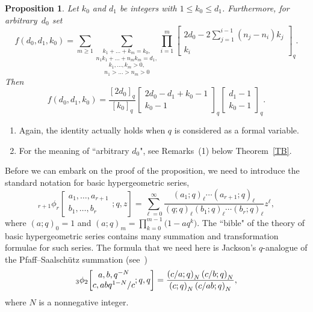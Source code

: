 \documentclass[10pt,a4paper]{amsart}
\newtheorem{Proposition}[Theorem]{Proposition}
 { \theoremstyle{definition}
\newtheorem{Definition}[Theorem]{Definition}
\newtheorem{Note}[Theorem]{Note}
\newtheorem{Example}[Theorem]{Example}
\newtheorem{Remark}[Theorem]{Remark}
\newtheorem*{Remarks}{Remarks} }
\def\poq#1#2{(#1;q)_#2}
\begin{document}
\begin{Proposition} \label{TC}
Let $k_0$ and $d_1$ be integers with $1\le k_0\le d_1$.
Furthermore, for arbitrary~$d_0$ set
\begin{equation} \label{AC}
f(d_0,d_1,k_0)=\sum_{m\ge1}
\underset{n_1>\dots>n_m>0}
{
\underset{k_1,\dots,k_m>0,}
{
\underset{n_1k_1+\dots+n_mk_m=d_1,}
{\sum_{k_1+\dots+k_m=k_0,}}}}
\prod_{i=1}^m \begin{bmatrix}
  2d_0-2\sum_{j=1}^{i-1}(n_j-n_i)k_j\\k_i\end{bmatrix}_q .
\end{equation}
Then
\begin{equation*}
f(d_0,d_1,k_0)=\frac {[2d_0]_q} {[k_0]_q}
\begin{bmatrix} 2d_0-d_1+k_0-1\\k_0-1\end{bmatrix}_q
\begin{bmatrix} d_1-1\\
k_0-1\end{bmatrix}_q.
\end{equation*}
\end{Proposition}

\begin{Remarks}\quad
\begin{enumerate}\itemsep=0pt
\item[(1)] Again, the identity actually holds when $q$ is considered as a
formal variable.

\item[(2)]
For the meaning of ``arbitrary $d_0$", see Remarks~(1) below
Theorem~\ref{TB}.
\end{enumerate}
\end{Remarks}

Before we can embark on the proof of the proposition, we need to
introduce the standard notation for basic hypergeometric series,
\begin{equation} \label{AH}
{}_{r+1}\phi_r\!\left[\begin{matrix} a_1,\dots,a_{r+1}\\
b_1,\dots,b_r\end{matrix}; q,z\right]
=\sum _{\ell=0} ^{\infty}\frac {\poq{a_1}{\ell}\cdots\poq{a_{r+1}}{\ell}}
{\poq{q}{\ell}\poq{b_1}{\ell}\cdots\poq{b_r}{\ell}}
z^\ell,
\end{equation}
where $(a;q)_0=1$ and $(a;q)_m=\prod_{k=0}^{m-1}\bigl(1-aq^k\bigr)$.
The ``bible" \cite{GaRaAF} of the theory of basic hypergeometric
series contains many summation and transformation formulae for such
series. The formula that we need here is Jackson's $q$-analogue
of the Pfaff--Saalsch\"utz summation
(see~\mbox{\cite[equation~(1.7.2); Appendix II.12]{GaRaAF}})
\begin{equation} \label{AE}
{}_3\phi _2\!\left [ \begin{matrix} \let\over/ a,b,{q^{-N}}\\ \let\over/  c,{{a b {q^{1 - N}}}/
   c}\end{matrix} ;q,q\right ] ={\frac {{(\let\over/ {c/ a};q)}_{N}\, {(\let\over/ {c/ b};q)}_{N}}
    {{(\let\over/ c;q)}_{N}\, {(\let\over/ {c\over {a b}};q)}_{N}}},
\end{equation}
where $N$ is a nonnegative integer.
\end{document}

